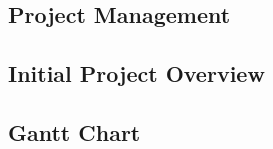\documentclass[12pt,a4paper]{article}
\newif\iffluff
\begin{document}
\newpage
\begin{appendices}
\iffluff
\section{Project Management}

\begin{subappendices}
\subsection{Initial Project Overview}



\subsection{Gantt Chart}\label{app:gantt}



\end{subappendices}
\end{appendices}
\end{document}

